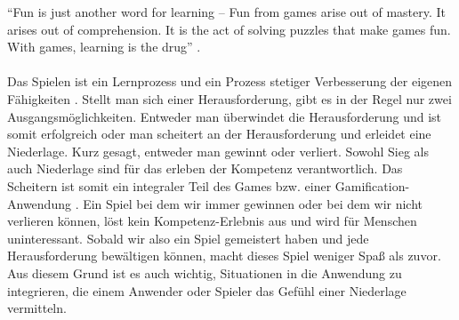 \documentclass[a4paper,12pt]{scrartcl}
\begin{document}
\enquote{Fun is just another word for learning – Fun from games arise out of mastery. It arises out of comprehension. It is the act of solving puzzles that make games fun. With games, learning is the drug} \cite{Koster2013}. 
\\\\
Das Spielen ist ein Lernprozess und ein Prozess stetiger Verbesserung der eigenen Fähigkeiten \cite{Rigby2011}. Stellt man sich einer Herausforderung, gibt es in der Regel nur zwei Ausgangsmöglichkeiten. Entweder man überwindet die Herausforderung und ist somit erfolgreich oder man scheitert an der Herausforderung und erleidet eine Niederlage. Kurz gesagt, entweder man gewinnt oder verliert. Sowohl Sieg als auch Niederlage sind für das erleben der Kompetenz verantwortlich. Das Scheitern ist somit ein integraler Teil des Games bzw. einer Gamification-Anwendung \cite{Mcgonigal2011}\cite{Lazzaro2004}. Ein Spiel bei dem wir immer gewinnen oder bei dem wir nicht verlieren können, löst kein Kompetenz-Erlebnis aus und wird für Menschen uninteressant. Sobald wir also ein Spiel gemeistert haben und jede Herausforderung bewältigen können, macht dieses Spiel weniger Spaß als zuvor. Aus diesem Grund ist es auch wichtig, Situationen in die Anwendung zu integrieren, die einem Anwender oder Spieler das Gefühl einer Niederlage vermitteln. 
\end{document}
